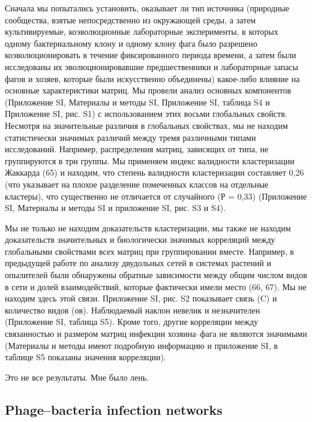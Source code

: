 \documentclass[a4paper,12pt]{article}
\begin{document}
    \par{Сначала мы попытались установить, оказывает ли тип источника (природные сообщества, взятые непосредственно из
    окружающей среды, а затем культивируемые, коэволюционные лабораторные эксперименты, в которых одному бактериальному
    клону и одному клону фага было разрешено коэволюционировать в течение фиксированного периода времени, а затем были
    исследованы их эволюционировавшие предшественники и лабораторные запасы фагов и хозяев, которые были искусственно
    объединены) какое-либо влияние на основные характеристики матриц. Мы провели анализ основных компонентов
    (Приложение SI, Материалы и методы SI, Приложение SI, таблица S4 и Приложение SI, рис. S1) с использованием этих
    восьми глобальных свойств. Несмотря на значительные различия в глобальных свойствах, мы не находим статистически
    значимых различий между тремя различными типами исследований. Например, распределения матриц, зависящих от типа, не
    группируются в три группы. Мы применяем индекс валидности кластеризации Жаккарда (65) и находим, что степень
    валидности кластеризации составляет 0,26 (что указывает на плохое разделение помеченных классов на отдельные
    кластеры), что существенно не отличается от случайного (Р = 0,33) (Приложение SI, Материалы и методы SI и
    приложение SI, рис. S3 и S4).}
    
    \par{Мы не только не находим доказательств кластеризации, мы также не находим доказательств значительных и
    биологически значимых корреляций между глобальными свойствами всех матриц при группировании вместе. Например, в
    предыдущей работе по анализу двудольных сетей в системах растений и опылителей были обнаружены обратные зависимости
    между общим числом видов в сети и долей взаимодействий, которые фактически имели место (66, 67). Мы не находим
    здесь этой связи. Приложение SI, рис. S2 показывает связь (C) и количество видов (ов). Наблюдаемый наклон невелик и
    незначителен (Приложение SI, таблица S5). Кроме того, другие корреляции между связанностью и размером матриц
    инфекции хозяина–фага не являются значимыми (Материалы и методы имеют подробную информацию и приложение SI, в
    таблице S5 показаны значения корреляции).}
    
    \par{{\Large Это не все результаты. Мне было лень.}}
   
    \subsection{Phage–bacteria infection networks \cite{networks}}
    
\end{document}
